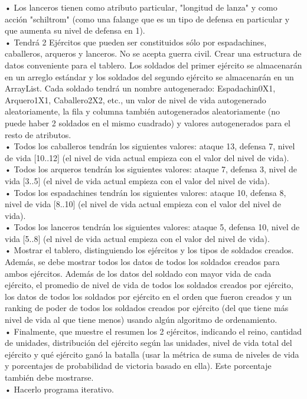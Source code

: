 \documentclass{article}
\begin{document}
\begin{itemize}
		• Los lanceros tienen como atributo particular, "longitud de lanza" y como acción
		"schiltrom" (como una falange que es un tipo de defensa en particular y que
		aumenta su nivel de defensa en 1).\\
		• Tendrá 2 Ejércitos que pueden ser constituidos sólo por espadachines,
		caballeros, arqueros y lanceros. No se acepta guerra civil. Crear una estructura
		de datos conveniente para el tablero. Los soldados del primer ejército se
		almacenarán en un arreglo estándar y los soldados del segundo ejército se
		almacenarán en un ArrayList. Cada soldado tendrá un nombre autogenerado:
		Espadachin0X1, Arquero1X1, Caballero2X2, etc., un valor de nivel de vida
		autogenerado aleatoriamente, la fila y columna también autogenerados
		aleatoriamente (no puede haber 2 soldados en el mismo cuadrado) y valores
		autogenerados para el resto de atributos.\\
		• Todos los caballeros tendrán los siguientes valores: ataque 13, defensa 7, nivel
		de vida [10..12] (el nivel de vida actual empieza con el valor del nivel de vida).\\
		• Todos los arqueros tendrán los siguientes valores: ataque 7, defensa 3, nivel
		de vida [3..5] (el nivel de vida actual empieza con el valor del nivel de vida).\\
		• Todos los espadachines tendrán los siguientes valores: ataque 10, defensa 8,
		nivel de vida [8..10] (el nivel de vida actual empieza con el valor del nivel de
		vida).\\
		• Todos los lanceros tendrán los siguientes valores: ataque 5, defensa 10, nivel
		de vida [5..8] (el nivel de vida actual empieza con el valor del nivel de vida).\\
		• Mostrar el tablero, distinguiendo los ejércitos y los tipos de soldados creados.
		Además, se debe mostrar todos los datos de todos los soldados creados para
		ambos ejércitos. Además de los datos del soldado con mayor vida de cada
		ejército, el promedio de nivel de vida de todos los soldados creados por ejército,
		los datos de todos los soldados por ejército en el orden que fueron creados y
		un ranking de poder de todos los soldados creados por ejército (del que tiene
		más nivel de vida al que tiene menos) usando algún algoritmo de ordenamiento.\\
		• Finalmente, que muestre el resumen los 2 ejércitos, indicando el reino, cantidad
		de unidades, distribución del ejército según las unidades, nivel de vida total del
		ejército y qué ejército ganó la batalla (usar la métrica de suma de niveles de
		vida y porcentajes de probabilidad de victoria basado en ella). Este porcentaje
		también debe mostrarse.\\
		• Hacerlo programa iterativo.\\
		\end{itemize}
\end{document}
